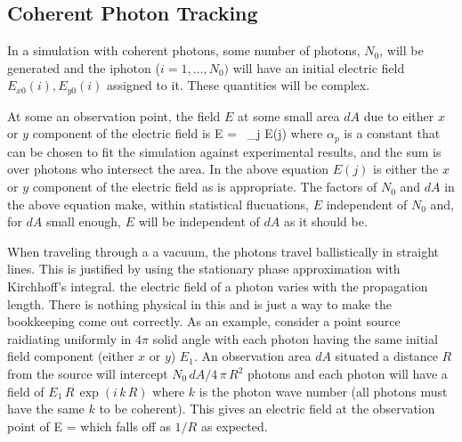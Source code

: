\subsection{Coherent Photon Tracking}

In a simulation with coherent photons, some number of photons,
$N_0$, will be generated and the i\Th photon ($i = 1, \ldots, N_0)$
will have an initial electric field $E_{x0}(i), E_{y0}(i)$ assigned to
it. These quantities will be complex.

At some an observation point, the field $E$ at
some small area $dA$ due to either $x$ or $y$ component of the
electric field is
\Begineq
  E =  \, \sum_{j \in {}} E(j)
  \label{panda2}
\Endeq
where $\alpha_p$ is a constant that can be chosen to fit the
simulation against experimental results, and the sum is over photons
who intersect the area. In the above equation $E(j)$ is either the $x$
or $y$ component of the electric field as is appropriate. The factors
of $N_0$ and $dA$ in the above equation make, within statistical
flucuations, $E$ independent of $N_0$ and, for $dA$ small enough, $E$
will be independent of $dA$ as it should be.

When traveling through a a vacuum, the photons travel ballistically in
straight lines. This is justified by using the stationary phase
approximation with Kirchhoff's integral. the electric field of a
photon varies with the propagation length. There is nothing physical
in this and is just a way to make the bookkeeping come out
correctly. As an example, consider a point source raidiating uniformly
in $4\pi$ solid angle with each photon having the same initial field
component (either $x$ or $y$) $E_1$.  An observation area $dA$
situated a distance $R$ from the source will intercept $N_0 \, dA / 4
\, \pi \, R^2$ photons and each photon will have a field of $E_1 \, R
\, \exp(i \, k \, R)$ where $k$ is the photon wave number (all photons
must have the same $k$ to be coherent). This gives an electric field
at the observation point of
\Begineq
  E = 
\Endeq
which falls off as $1/R$ as expected.

